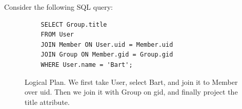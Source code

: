 \documentclass{article}
\begin{document}
      \begin{example}
        Consider the following SQL query:
        \begin{lstlisting}
          SELECT Group.title
          FROM User
          JOIN Member ON User.uid = Member.uid
          JOIN Group ON Member.gid = Group.gid
          WHERE User.name = 'Bart';
        \end{lstlisting}

        \begin{figure}[H]
          \centering 
          \caption{Logical Plan. We first take User, select Bart, and join it to Member over uid. Then we join it with Group on gid, and finally project the title attribute.} 
          \label{fig:logical_plan}
        \end{figure}


\end{example}
\end{document}
